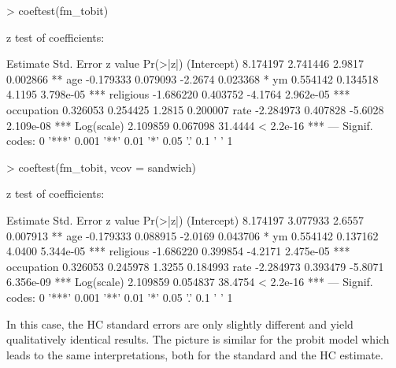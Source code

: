 \documentclass{Z}
\begin{document}
\begin{Schunk}
\begin{Sinput}
> coeftest(fm_tobit)
\end{Sinput}
\begin{Soutput}
z test of coefficients:

             Estimate Std. Error z value  Pr(>|z|)    
(Intercept)  8.174197   2.741446  2.9817  0.002866 ** 
age         -0.179333   0.079093 -2.2674  0.023368 *  
ym           0.554142   0.134518  4.1195 3.798e-05 ***
religious   -1.686220   0.403752 -4.1764 2.962e-05 ***
occupation   0.326053   0.254425  1.2815  0.200007    
rate        -2.284973   0.407828 -5.6028 2.109e-08 ***
Log(scale)   2.109859   0.067098 31.4444 < 2.2e-16 ***
---
Signif. codes:  0 '***' 0.001 '**' 0.01 '*' 0.05 '.' 0.1 ' ' 1 
\end{Soutput}
\begin{Sinput}
> coeftest(fm_tobit, vcov = sandwich)
\end{Sinput}
\begin{Soutput}
z test of coefficients:

             Estimate Std. Error z value  Pr(>|z|)    
(Intercept)  8.174197   3.077933  2.6557  0.007913 ** 
age         -0.179333   0.088915 -2.0169  0.043706 *  
ym           0.554142   0.137162  4.0400 5.344e-05 ***
religious   -1.686220   0.399854 -4.2171 2.475e-05 ***
occupation   0.326053   0.245978  1.3255  0.184993    
rate        -2.284973   0.393479 -5.8071 6.356e-09 ***
Log(scale)   2.109859   0.054837 38.4754 < 2.2e-16 ***
---
Signif. codes:  0 '***' 0.001 '**' 0.01 '*' 0.05 '.' 0.1 ' ' 1 
\end{Soutput}
\end{Schunk}

In this case, the HC standard errors are only slightly different and yield
qualitatively identical results. The picture is similar for the probit model
which leads to the same interpretations, both for the standard and the HC 
estimate.
\end{document}

